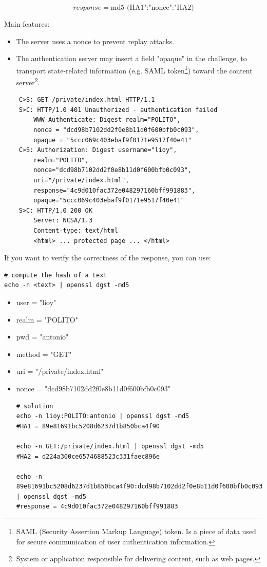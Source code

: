 \[
    response = \text{md5 (HA1":"nonce":"HA2)}
\]

Main features:
\begin{itemize}
    \item The server uses a nonce to prevent replay attacks.
    \item The authentication server may insert a field "opaque" in the challenge, to transport state-related information (e.g. SAML token\footnote{SAML (Security Assertion Markup Language) token. Is a piece of data used for secure communication of user authentication information.}) toward the content server\footnote{System or application responsible for delivering content, such as web pages.}.
\end{itemize}

\begin{verbatim}
    C>S: GET /private/index.html HTTP/1.1
    S>C: HTTP/1.0 401 Unauthorized - authentication failed
        WWW-Authenticate: Digest realm="POLITO",
        nonce = "dcd98b7102dd2f0e8b11d0f600bfb0c093",
        opaque = "5ccc069c403ebaf9f0171e9517f40e41"
    C>S: Authorization: Digest username="lioy",
        realm="POLITO", 
        nonce="dcd98b7102dd2f0e8b11d0f600bfb0c093",
        uri="/private/index.html", 
        response="4c9d010fac372e048297160bff991883",
        opaque="5ccc069c403ebaf9f0171e9517f40e41"
    S>C: HTTP/1.0 200 OK
        Server: NCSA/1.3
        Content-type: text/html
        <html> ... protected page ... </html>
\end{verbatim}
\begin{tcolorbox}[colback=blue!10!white, colframe=blue!50!white, title=Exercise]
If you want to verify the correctness of the response, you can use:
\begin{lstlisting}[style=bashStyle]
# compute the hash of a text
echo -n <text> | openssl dgst -md5
\end{lstlisting}
    \begin{itemize}
        \item user = "lioy"
        \item realm = "POLITO"
        \item pwd = "antonio"
        \item method = "GET"
        \item uri = "/private/index.html"
        \item nonce = "dcd98b7102dd2f0e8b11d0f600bfb0c093"
        \begin{lstlisting}[style=bashStyle]
# solution
echo -n lioy:POLITO:antonio | openssl dgst -md5
#HA1 = 89e81691bc5208d6237d1b850bca4f90

echo -n GET:/private/index.html | openssl dgst -md5
#HA2 = d224a300ce6574688523c331faec896e

echo -n 89e81691bc5208d6237d1b850bca4f90:dcd98b7102dd2f0e8b11d0f600bfb0c093:d224a300ce6574688523c331faec896e | openssl dgst -md5
#response = 4c9d010fac372e048297160bff991883

        \end{lstlisting}
    \end{itemize}
\end{tcolorbox}

